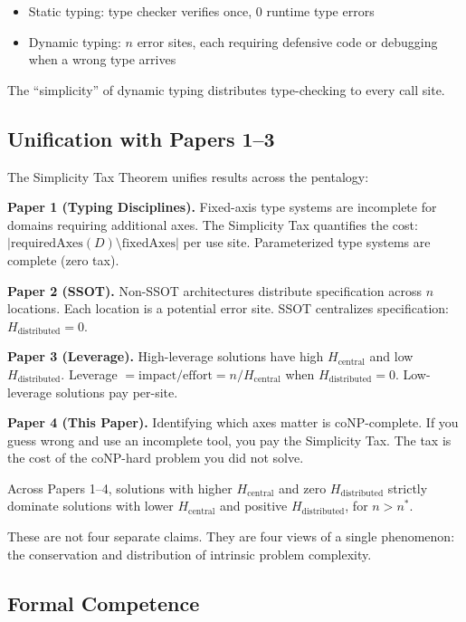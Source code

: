 \begin{itemize}
\item Static typing: type checker verifies once, 0 runtime type errors
\item Dynamic typing: $n$ error sites, each requiring defensive code or debugging when a wrong type arrives
\end{itemize}

The ``simplicity'' of dynamic typing distributes type-checking to every call site.

\subsection{Unification with Papers 1--3}\label{sec:unification}

The Simplicity Tax Theorem unifies results across the pentalogy:

\textbf{Paper 1 (Typing Disciplines).} Fixed-axis type systems are incomplete for domains requiring additional axes. The Simplicity Tax quantifies the cost: $|\text{requiredAxes}(D) \setminus \text{fixedAxes}|$ per use site. Parameterized type systems are complete (zero tax).

\textbf{Paper 2 (SSOT).} Non-SSOT architectures distribute specification across $n$ locations. Each location is a potential error site. SSOT centralizes specification: $H_{\text{distributed}} = 0$.

\textbf{Paper 3 (Leverage).} High-leverage solutions have high $H_{\text{central}}$ and low $H_{\text{distributed}}$. Leverage $= \text{impact}/\text{effort} = n / H_{\text{central}}$ when $H_{\text{distributed}} = 0$. Low-leverage solutions pay per-site.

\textbf{Paper 4 (This Paper).} Identifying which axes matter is coNP-complete. If you guess wrong and use an incomplete tool, you pay the Simplicity Tax. The tax is the cost of the coNP-hard problem you did not solve.

\begin{theorem}
Across Papers 1--4, solutions with higher $H_{\text{central}}$ and zero $H_{\text{distributed}}$ strictly dominate solutions with lower $H_{\text{central}}$ and positive $H_{\text{distributed}}$, for $n > n^*$.

These are not four separate claims. They are four views of a single phenomenon: the conservation and distribution of intrinsic problem complexity.
\end{theorem}

\subsection{Formal Competence}\label{sec:competence}

